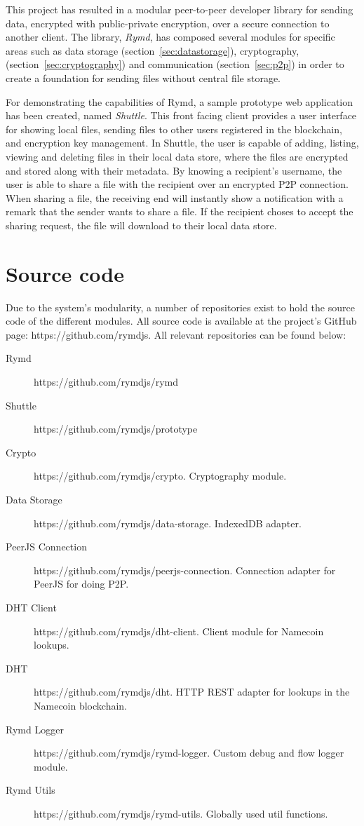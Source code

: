 
This project has resulted in a modular peer-to-peer developer library for sending data, encrypted with public-private encryption, over a secure connection to another client. The library, \emph{Rymd}, has composed several modules for specific areas such as data storage (section~\ref{sec:datastorage}), cryptography, (section~\ref{sec:cryptography}) and communication (section~\ref{sec:p2p}) in order to create a foundation for sending files without central file storage.

For demonstrating the capabilities of Rymd, a sample prototype web application has been created, named \emph{Shuttle}. This front facing client provides a user interface for showing local files, sending files to other users registered in the blockchain, and encryption key management. In Shuttle, the user is capable of adding, listing, viewing and deleting files in their local data store, where the files are encrypted and stored along with their metadata. By knowing a recipient's username, the user is able to share a file with the recipient over an encrypted P2P connection. When sharing a file, the receiving end will instantly show a notification with a remark that the sender wants to share a file. If the recipient choses to accept the sharing request, the file will download to their local data store.


\section{Source code}

Due to the system's modularity, a number of repositories exist to hold the source code of the different modules. All source code is available at the project's GitHub page: https://github.com/rymdjs. All relevant repositories can be found below:

\begin{description}
  \item[Rymd] https://github.com/rymdjs/rymd
  \item[Shuttle] https://github.com/rymdjs/prototype
  \item[Crypto] https://github.com/rymdjs/crypto. Cryptography module.
  \item[Data Storage] https://github.com/rymdjs/data-storage. IndexedDB adapter.
  \item[PeerJS Connection] https://github.com/rymdjs/peerjs-connection. Connection adapter for PeerJS for doing P2P.
  \item[DHT Client] https://github.com/rymdjs/dht-client. Client module for Namecoin lookups.
  \item[DHT] https://github.com/rymdjs/dht. HTTP REST adapter for lookups in the Namecoin blockchain.
  \item[Rymd Logger] https://github.com/rymdjs/rymd-logger. Custom debug and flow logger module.
  \item[Rymd Utils] https://github.com/rymdjs/rymd-utils. Globally used util functions.
\end{description}

